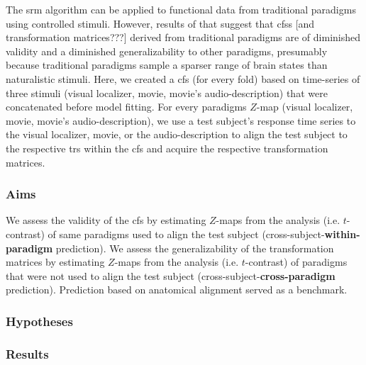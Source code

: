 The \ac{srm} algorithm can be applied to functional data from traditional
paradigms using controlled stimuli.
%
However, results of \citet{haxby2011common} that suggest that \acp{cfs} [and
transformation matrices???] derived from traditional paradigms are of diminished
validity and a diminished generalizability to other paradigms, presumably
because traditional paradigms sample a sparser range of brain states than
naturalistic stimuli.
%
Here, we created a \ac{cfs} (for every fold) based on time-series of three
stimuli (visual localizer, movie, movie's audio-description) that were
concatenated before model fitting.
%
For every paradigms $Z$-map (visual localizer, movie, movie's
audio-description), we use a test subject's response time series to the visual
localizer, movie, or the audio-description to align the test subject to the
respective \acp{tr} within the \ac{cfs} and acquire the respective
transformation matrices.


\subsubsection{Aims}



%
We assess the validity of the \ac{cfs} by estimating $Z$-maps from the analysis
(i.e. $t$-contrast) of same paradigms used to align the test subject
(cross-subject-\textbf{within-paradigm} prediction).
%
We assess the generalizability of the transformation matrices by estimating
$Z$-maps from the analysis (i.e. $t$-contrast) of paradigms that were not used
to align the test subject (cross-subject-\textbf{cross-paradigm} prediction).
%
Prediction based on anatomical alignment served as a benchmark.


\subsubsection{Hypotheses}



\subsubsection{Results}







